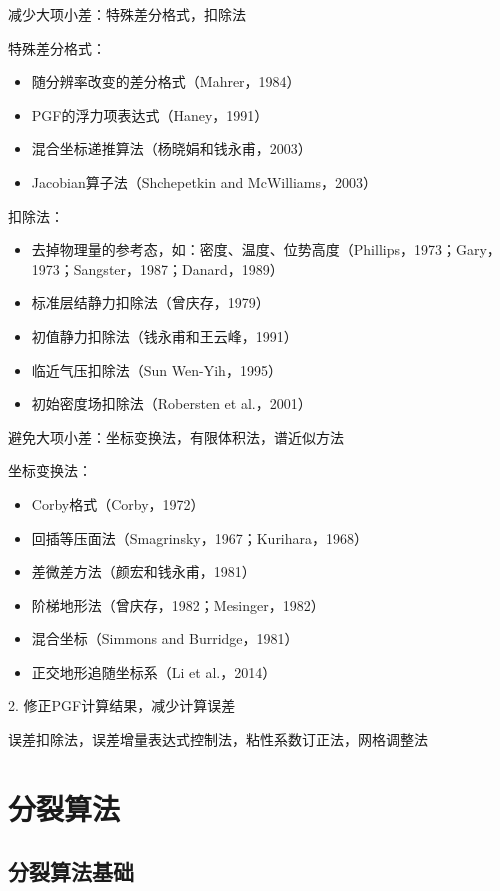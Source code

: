 \documentclass{article}
\begin{document}
减少大项小差：特殊差分格式，扣除法

特殊差分格式：
\begin{itemize}
    \item 随分辨率改变的差分格式（Mahrer，1984）
    \item PGF的浮力项表达式（Haney，1991）
    \item 混合坐标递推算法（杨晓娟和钱永甫，2003）
    \item Jacobian算子法（Shchepetkin and McWilliams，2003）
\end{itemize}

扣除法：
\begin{itemize}
    \item 去掉物理量的参考态，如：密度、温度、位势高度（Phillips，1973；Gary，1973；Sangster，1987；Danard，1989）
    \item 标准层结静力扣除法（曾庆存，1979）
    \item 初值静力扣除法（钱永甫和王云峰，1991）
    \item 临近气压扣除法（Sun Wen-Yih，1995）
    \item 初始密度场扣除法（Robersten et al.，2001）
\end{itemize}

避免大项小差：坐标变换法，有限体积法，谱近似方法

坐标变换法：
\begin{itemize}
    \item Corby格式（Corby，1972）
    \item 回插等压面法（Smagrinsky，1967；Kurihara，1968）
    \item 差微差方法（颜宏和钱永甫，1981）
    \item 阶梯地形法（曾庆存，1982；Mesinger，1982）
    \item 混合坐标（Simmons and Burridge，1981）
    \item 正交地形追随坐标系（Li et al.，2014）
\end{itemize}


2. 修正PGF计算结果，减少计算误差

误差扣除法，误差增量表达式控制法，粘性系数订正法，网格调整法

\newpage
\section{分裂算法}
\subsection{分裂算法基础}
\end{document}
